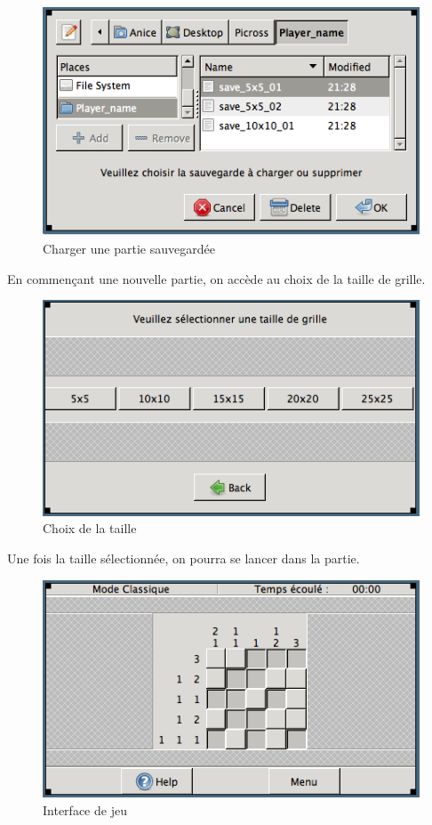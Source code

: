 \documentclass[11pt]{article}
\begin{document}
		\begin{figure}[!ht]
			\centering
			\includegraphics[]{./IHM/charger_supprimer.png}
			\caption{Charger une partie sauvegardée}
		\end{figure}
	
	\FloatBarrier
	
	En commençant une nouvelle partie, on accède au choix de la taille de grille.
	
		\begin{figure}[!ht]
			\centering
			\includegraphics[]{./IHM/taille.png}
			\caption{Choix de la taille}
		\end{figure}
		
	\FloatBarrier
	
	Une fois la taille sélectionnée, on pourra se lancer dans la partie.
	
		\begin{figure}[!ht]
			\centering
			\includegraphics[]{./IHM/jeu.png}
			\caption{Interface de jeu}
		\end{figure}
		
\end{document}
